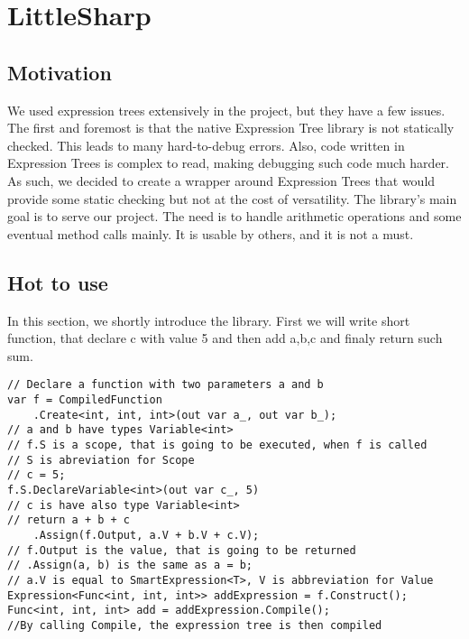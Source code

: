 \chapter{LittleSharp}
\section{Motivation}
We used expression trees extensively in the project, but they have a few issues. The first and foremost is that the native Expression Tree library is not statically checked. This leads to many hard-to-debug errors. Also, code written in Expression Trees is complex to read, making debugging such code much harder. As such, we decided to create a wrapper around Expression Trees that would provide some static checking but not at the cost of versatility. The library's main goal is to serve our project.  The need is to handle arithmetic operations and some eventual method calls mainly. It is usable by others, and it is not a must.

\section{Hot to use}
In this section, we shortly introduce the library. First we will write short function, that declare c with value 5 and then add a,b,c and finaly return such sum.
\begin{lstlisting}
// Declare a function with two parameters a and b
var f = CompiledFunction
    .Create<int, int, int>(out var a_, out var b_);
// a and b have types Variable<int>
// f.S is a scope, that is going to be executed, when f is called
// S is abreviation for Scope
// c = 5; 
f.S.DeclareVariable<int>(out var c_, 5)
// c is have also type Variable<int>
// return a + b + c
	.Assign(f.Output, a.V + b.V + c.V);
// f.Output is the value, that is going to be returned
// .Assign(a, b) is the same as a = b;
// a.V is equal to SmartExpression<T>, V is abbreviation for Value
Expression<Func<int, int, int>> addExpression = f.Construct();
Func<int, int, int> add = addExpression.Compile();
//By calling Compile, the expression tree is then compiled 
\end{lstlisting}

